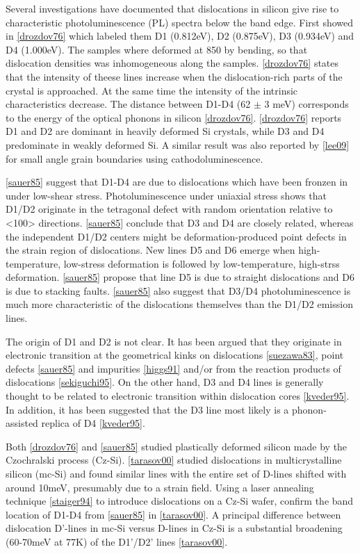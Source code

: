 Several investigations have documented that dislocations in silicon give rise to characteristic photoluminescence (PL) spectra below the band edge. First showed in \ref{drozdov76} which labeled them D1 (0.812eV), D2 (0.875eV), D3 (0.934eV) and D4 (1.000eV). The samples where deformed at 850 \degrees by bending, so that dislocation densities was inhomogeneous along the samples. \ref{drozdov76} states that the intensity of theese lines increase when the dislocation-rich parts of the crystal is approached. At the same time the intensity of the intrinsic characteristics decrease. The distance between D1-D4 (62 $\pm$ 3 meV) corresponds to the energy of the optical phonons in silicon \ref{drozdov76}. \ref{drozdov76} reports D1 and D2 are dominant in heavily deformed Si crystals, while D3 and D4 predominate in weakly deformed Si. A similar result was also reported by \ref{lee09} for small angle grain boundaries using cathodoluminescence.

\ref{sauer85} suggest that D1-D4 are due to dislocations which have been fronzen in under low-shear stress. Photoluminescence under uniaxial stress shows that D1/D2 originate in the tetragonal defect with random orientation relative to <100> directions. \ref{sauer85} conclude that D3 and D4 are closely related, whereas the independent D1/D2 centers might be deformation-produced point defects in the strain region of dislocations. New lines D5 and D6 emerge when high-temperature, low-stress deformation is followed by low-temperature, high-strss deformation. \ref{sauer85} propose that line D5 is due to straight dislocations and D6 is due to stacking faults. \ref{sauer85} also suggest that D3/D4 photoluminescence is much more characteristic of the dislocations themselves than the D1/D2 emission lines.


The origin of D1 and D2 is not clear. It has been argued that they originate in electronic transition at the geometrical kinks on dislocations \ref{suezawa83}, point defects \ref{sauer85} and impurities \ref{higgs91} and/or from the reaction products of dislocations \ref{sekiguchi95}. On the other hand, D3 and D4 lines is generally thought to be related to electronic transition within dislocation cores \ref{kveder95}. In addition, it has been suggested that the D3 line most likely is a phonon-assisted replica of D4 \ref{kveder95}.




Both \ref{drozdov76} and \ref{sauer85} studied plastically deformed silicon made by the Czochralski process (Cz-Si). \ref{tarasov00} studied  dislocations in multicrystalline silicon (mc-Si) and found similar lines with the entire set of D-lines shifted with around 10meV, presumably due to a strain field. Using a laser annealing technique \ref{staiger94} to introduce dislocations on a Cz-Si wafer, confirm the band location of D1-D4 from \ref{sauer85} in \ref{tarasov00}. A principal difference between dislocation D'-lines in mc-Si versus D-lines in Cz-Si is a substantial broadening (60-70meV at 77K) of the D1'/D2' lines \ref{tarasov00}.


